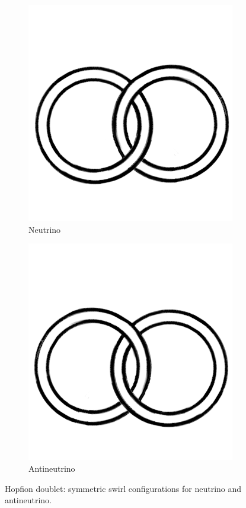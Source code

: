 \begin{figure}[H]
    \centering
    \begin{subfigure}[b]{0.3\textwidth}
        \includegraphics[width=\textwidth]{images/hopf}
        \caption{Neutrino}
    \end{subfigure}
    \hspace{1em}
    \begin{subfigure}[b]{0.3\textwidth}
        \includegraphics[width=\textwidth]{images/ahopf}
        \caption{Antineutrino}
    \end{subfigure}
    \caption{Hopfion doublet: symmetric swirl configurations for neutrino and antineutrino.}
\end{figure}

